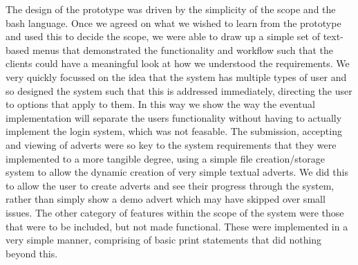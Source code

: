 The design of the prototype was driven by the simplicity of the scope and the bash language. Once we agreed on
what we wished to learn from the prototype and used this to decide the scope, we were able to draw up a simple
set of text-based menus that demonstrated the functionality and workflow such that the clients could have a 
meaningful look at how we understood the requirements. We very quickly focussed on the idea that the system has 
multiple types of user and so designed the system such that this is addressed immediately, directing the user to
options that apply to them. In this way we show the way the eventual implementation will separate the users 
functionality without having to actually implement the login system, which was not feasable. The submission, 
accepting and viewing of adverts were so key to the system requirements that they were implemented to a 
more tangible degree, using a simple file creation/storage system to allow the dynamic creation of very simple
textual adverts. We did this to allow the user to create adverts and see their progress through the system, rather 
than simply show a demo advert which may have skipped over small issues. The other category of features 
within the scope of the system were those that were to be included, but not made functional. These were 
implemented in a very simple manner, comprising of basic print statements that did nothing beyond this.